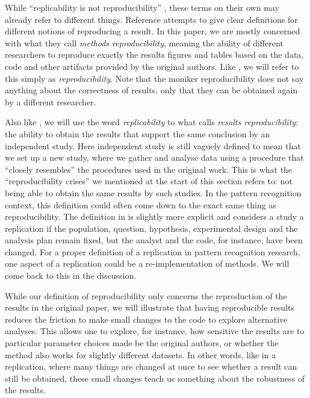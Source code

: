 \documentclass[runningheads,a4paper]{llncs}\usepackage[]{graphicx}\usepackage[]{color}
\begin{document}
While ``replicability is not reproducibility'' \cite{Drummond2009}, these terms on their own may already refer to different things. Reference \cite{Goodman2016a} attempts to give clear definitions for different notions of reproducing a result. In this paper, we are mostly concerned with what they call \emph{methods reproducibility}, meaning the ability of different researchers to reproduce exactly the results figures and tables based on the data, code and other artifacts provided by the original authors. Like \cite{Patil2016}, we will refer to this simply as \emph{reproducibility}. Note that the moniker reproducibility does not say anything about the correctness of results, only that they can be obtained again by a different researcher.

Also like \cite{Patil2016}, we will use the word \emph{replicability} to what \cite{Goodman2016a} calls \emph{results reproducibility}: the ability to obtain the results that support the same conclusion by an independent study. Here independent study is still vaguely defined to mean that we set up a new study, where we gather and analyse data using a procedure that ``closely resembles'' the procedures used in the original work.  This is what the ``reproducibility crises'' we mentioned at the start of this section refers to: not being able to obtain the same results by such studies. In the pattern recognition context, this definition could often come down to the exact same thing as reproducibility. The definition in \cite{Patil2016} is slightly more explicit and considers a study a replication if the population, question, hypothesis, experimental design and the analysis plan remain fixed, but the analyst and the code, for instance, have been changed. For a proper definition of a replication in pattern recognition research, one aspect of a replication could be a re-implementation of methods. We will come back to this in the discussion.

While our definition of reproducibility only concerns the reproduction of the results in the original paper, we will illustrate that having reproducible results reduces the friction to make small changes to the code to explore alternative analyses. This allows one to explore, for instance, how sensitive the results are to particular parameter choices made be the original authors, or whether the method also works for slightly different datasets. In other words, like in a replication, where many things are changed at once to see whether a result can still be obtained, these small changes teach us something about the robustness of the results.
\end{document}

